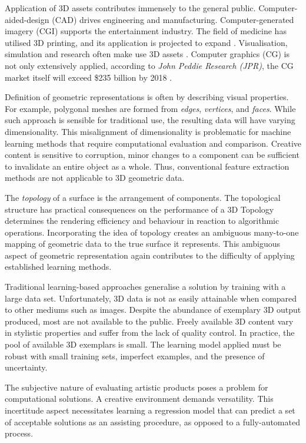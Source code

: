 \documentclass[a4paper, fontsize=15pt, onecolumn]{article} %
\numberwithin{equation}{section} %
\numberwithin{figure}{section} %
\numberwithin{table}{section} %
\begin{document}
Application of 3D assets contributes immensely to the general public.
Computer-aided-design (CAD) drives engineering and manufacturing.
Computer-generated imagery (CGI) supports the entertainment industry.
The field of medicine has utilised 3D printing, and its application is projected to expand \cite{3dprinting}.
Visualisation, simulation and research often make use 3D assets \cite{simulation}.
Computer graphics (CG) is not only extensively applied, according to \textit{John Peddie Research (JPR)}, the CG market itself will exceed \$235 billion by 2018 \cite{cgmarket}.

Definition of geometric representations is often by describing visual properties. For example, polygonal meshes are formed from \textit{edges}, \textit{vertices},  and \textit{faces}. While such approach is sensible for traditional use, the resulting data will have varying dimensionality. This misalignment of dimensionality is problematic for machine learning methods that require computational evaluation and comparison. Creative content is sensitive to corruption, minor changes to a component can be sufficient to invalidate an entire object as a whole. Thus, conventional feature extraction methods are not applicable to 3D geometric data.

The \textit{topology} of a surface is the arrangement of components. The topological structure has practical consequences on the performance of a 3D Topology determines the rendering efficiency and behaviour in reaction to algorithmic operations. Incorporating the idea of topology creates an ambiguous many-to-one mapping of geometric data to the true surface it represents. This ambiguous aspect of geometric representation again contributes to the difficulty of applying established learning methods.

Traditional learning-based approaches generalise a solution by training with a large data set. Unfortunately, 3D data is not as easily attainable when compared to other mediums such as images. Despite the abundance of exemplary 3D output produced, most are not available to the public. Freely available 3D content vary in stylistic properties and suffer from the lack of quality control. In practice, the pool of available 3D exemplars is small. The learning model applied must be robust with small training sets, imperfect examples, and the presence of uncertainty.

The subjective nature of evaluating artistic products poses a problem for computational solutions. A creative environment demands versatility. This incertitude aspect necessitates learning a regression model that can predict a set of acceptable solutions as an assisting procedure, as opposed to a fully-automated process.
\end{document}
